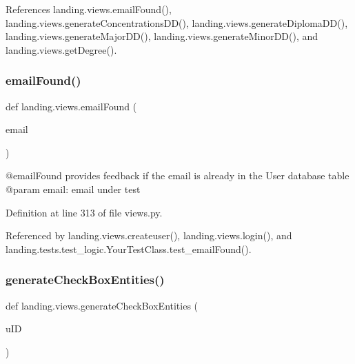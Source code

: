 References landing.\+views.\+email\+Found(), landing.\+views.\+generate\+Concentrations\+D\+D(), landing.\+views.\+generate\+Diploma\+D\+D(), landing.\+views.\+generate\+Major\+D\+D(), landing.\+views.\+generate\+Minor\+D\+D(), and landing.\+views.\+get\+Degree().

\mbox{\label{namespacelanding_1_1views_a54774f163c70feb2df73511f76bfd877}} 
\subsubsection{\texorpdfstring{email\+Found()}{emailFound()}}
{\footnotesize\ttfamily def landing.\+views.\+email\+Found (\begin{DoxyParamCaption}\item[{}]{email }\end{DoxyParamCaption})}

\begin{DoxyVerb}@emailFound provides feedback if the email is already in the User database table
@param email: email under test
\end{DoxyVerb}
 

Definition at line 313 of file views.\+py.



Referenced by landing.\+views.\+createuser(), landing.\+views.\+login(), and landing.\+tests.\+test\+\_\+logic.\+Your\+Test\+Class.\+test\+\_\+email\+Found().

\mbox{\label{namespacelanding_1_1views_a0d4c1e9d73373e8f2956340085eb50b2}} 
\subsubsection{\texorpdfstring{generate\+Check\+Box\+Entities()}{generateCheckBoxEntities()}}
{\footnotesize\ttfamily def landing.\+views.\+generate\+Check\+Box\+Entities (\begin{DoxyParamCaption}\item[{}]{u\+ID }\end{DoxyParamCaption})}

